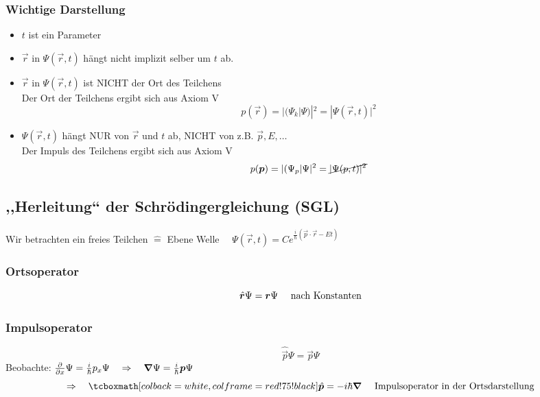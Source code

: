 \subsubsection{Wichtige Darstellung}

\begin{itemize}
	\item $t$ ist ein Parameter
	\item $\vec{r}$ in $\Psi(\vec{r},t)$ hängt nicht implizit selber um $t$ ab.
	\item $\vec{r}$ in $\Psi(\vec{r},t)$ ist \color{red} NICHT \color{black} der Ort des Teilchens \mau\\
	Der Ort der Teilchens ergibt sich aus Axiom V
	$$p(\vec{r}) = |(\Psi_k|\Psi)|^2 = |\Psi(\vec{r},t)|^2$$
	\item $\Psi(\vec{r},t)$ hängt \color{red} NUR \color{black} von $\vec{r}$ und $t$ ab, \color{red} NICHT \color{black} von z.B. $\vec{p}, E, \dots$\\
	Der Impuls des Teilchens ergibt sich aus Axiom V
	$$p(\vec{p}) = |(\Psi_p | \Psi|^2 = \cancel{| \Psi(p,t)|^2}$$
\end{itemize}

\subsection{,,Herleitung`` der Schrödingergleichung (SGL)}

Wir betrachten ein freies Teilchen $ \widehat{=} $ Ebene Welle $ \quad \Psi(\vec{r},t) = C e^{\frac{i}{\hbar} (\vec{p} \cdot \vec{r} - E t)} $

\subsubsection{Ortsoperator}

\begin{equation*}
\hat{\vec{r}} \Psi = \vec{r} \Psi \quad \tx{ nach Konstanten}
\end{equation*}

\subsubsection{Impulsoperator}

\begin{equation*}
\hat{\vec{p}} \Psi = \vec{p} \Psi
\end{equation*}
Beobachte: $ \prt{}{x} \Psi = \frac{i}{\hbar} p_x \Psi \quad \Rightarrow \quad \vabla \Psi = \frac{i}{\hbar} \vec{p} \Psi $
\begin{equation*}
\Rightarrow \quad \rmbox{\hat{\vec{p}} = - i \hbar \vabla} \quad \tx{ Impulsoperator in der Ortsdarstellung}
\end{equation*}


